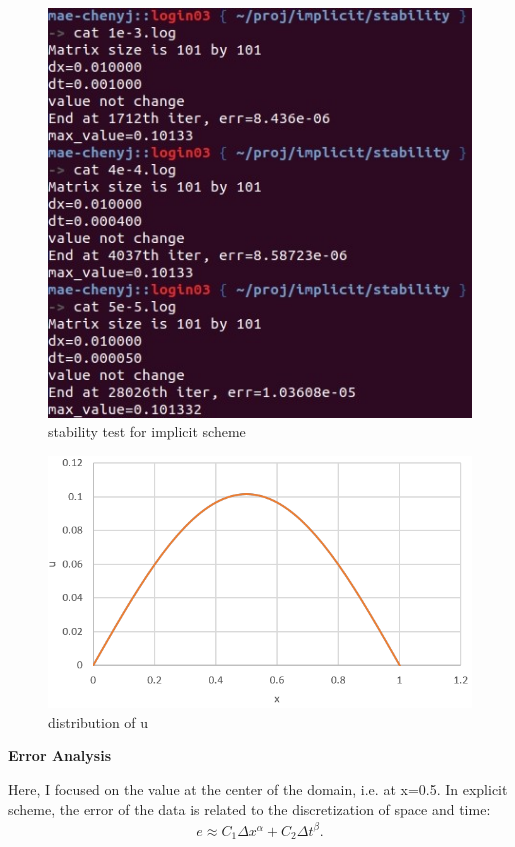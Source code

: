 \documentclass[a4paper,10pt]{article}
\begin{document}
\begin{figure}[h]
	\centering
	\includegraphics[scale=0.8]{implicit_stability.jpg}
	\caption{stability test for implicit scheme}
\end{figure}


\begin{figure}[h]
	\centering
	\includegraphics[scale=0.5]{u_x.png}
	\caption{distribution of u}
\end{figure}

\clearpage
\large \textbf {Error Analysis}

Here, I focused on the value at the center of the domain, i.e. at x=0.5. In explicit scheme, the error of the data is related to the discretization of space and time: 
\begin{align}
e \approx C_1 \Delta x^\alpha + C_2 \Delta t^\beta .
\end{align}
\end{document}
